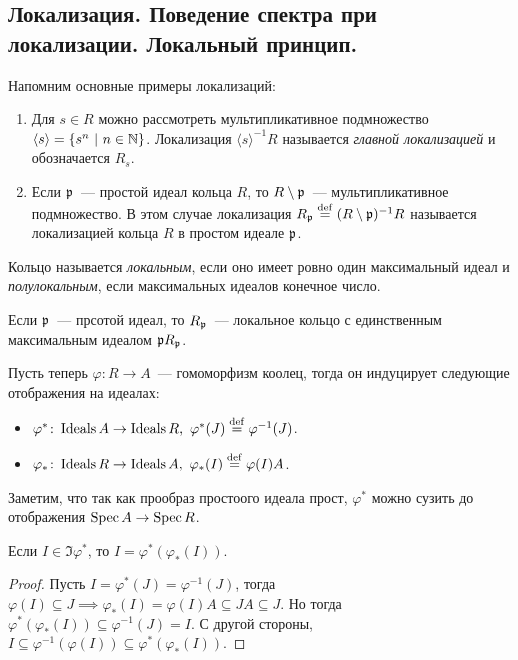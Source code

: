 	\subsection{Локализация. Поведение спектра при локализации. Локальный принцип.}

	Напомним основные примеры локализаций:

	\begin{enumerate}
		\item Для $s \in R$ можно рассмотреть мультипликативное подмножество $\langle s \rangle = \{ s^n \ \vert \ n \in \mathbb{N} \}$.  Локализация $\langle s \rangle^{-1}R$ называется \emph{главной локализацией} и обозначается $R_{s}$.

		\item Если $\mathfrak{p}$~--- простой идеал кольца $R$, то $R \setminus \mathfrak{p}$~--- мультипликативное подмножество. В этом случае локализация $R_{\mathfrak{p}} \stackrel{\mathrm{def}}{=} (R\setminus \mathfrak{p})^{-1}R$ называется локализацией кольца $R$ в простом идеале $\mathfrak{p}$.

	\end{enumerate}

	\begin{definition} 
		Кольцо называется \emph{локальным}, если оно имеет ровно один максимальный идеал и \emph{полулокальным}, если максимальных идеалов конечное число. 
	\end{definition}

	Если $\mathfrak{p}$~--- прсотой идеал, то $R_{\mathfrak{p}}$~--- локальное кольцо с единственным максимальным идеалом $\mathfrak{p} R_{\mathfrak{p}}$. 

	Пусть теперь $\varphi\colon R \to A$~--- гомоморфизм коолец, тогда он индуцирует следующие отображения на идеалах: 
	\begin{itemize}
		\item $\varphi^{*}\colon \operatorname{Ideals}{A} \to \operatorname{Ideals}{R}, \ \varphi^{*}(J) \stackrel{\mathrm{def}}{=} \varphi^{-1}(J)$.
		\item $\varphi_{*}\colon \operatorname{Ideals}{R} \to \operatorname{Ideals}{A}, \ \varphi_{*}(I) \stackrel{\mathrm{def}}{=}  \varphi(I)A$.
	\end{itemize}

	Заметим, что так как прообраз простоого идеала прост, $\varphi^{*}$ можно сузить до отображения $\operatorname{Spec}{A} \to \operatorname{Spec}{R}$.

	\begin{lemma} 
		Если $I \in \Im{\varphi^{*}}$, то $I = \varphi^{*}(\varphi_{*}(I))$.
	\end{lemma}
	\begin{proof}
		Пусть $I = \varphi^{*}(J) = \varphi^{-1}(J)$, тогда $\varphi(I) \subseteq J \implies  \varphi_{*}(I) = \varphi(I)A \subseteq JA \subseteq J$. Но тогда $\varphi^{*}(\varphi_{*}(I)) \subseteq \varphi^{-1}(J) = I$. С другой стороны, $I \subseteq \varphi^{-1}(\varphi(I)) \subseteq \varphi^{*}(\varphi_{*}(I))$.
	\end{proof}

